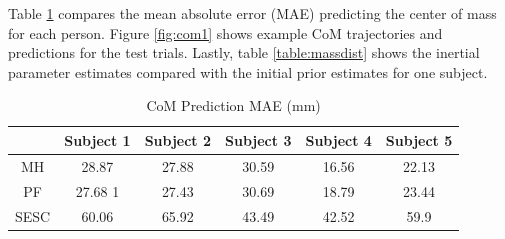 Table \ref{table:RMSE} compares the mean absolute error (MAE) predicting the center of mass for each person. Figure \ref{fig:com1} shows example CoM trajectories and predictions for the test trials. Lastly, table \ref{table:massdist} shows the inertial parameter estimates compared with the initial prior estimates for one subject.
\begin{table}
\caption{CoM Prediction MAE (mm)}
\label{table:RMSE}
\begin{center}
\begin{tabular}{|c|c|c|c|c|c|}
\hline
 & Subject 1 & Subject 2 & Subject 3 & Subject 4 & Subject 5\\
\hline
MH & 28.87   & 27.88 & 30.59 & 16.56 & 22.13\\
\hline
PF & 27.68 1 & 27.43 & 30.69 & 18.79 & 23.44\\
\hline
SESC & 60.06 & 65.92 & 43.49 & 42.52 &  59.9\\
\hline
\end{tabular}
\end{center}
\end{table}








